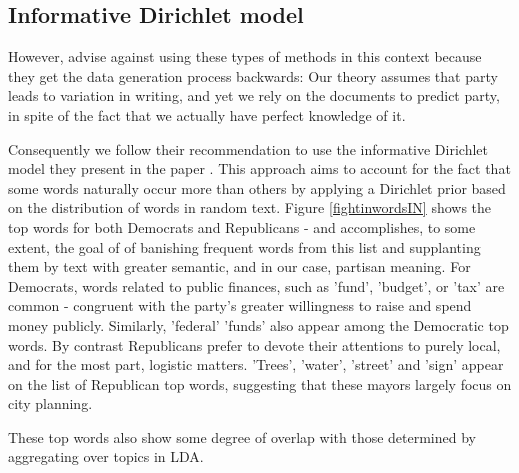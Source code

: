\documentclass[11pt]{article}
\begin{document}

\subsection{Informative Dirichlet model}
However, \cite{Monroe2008} advise against using these types of methods in this context because they get the data generation process backwards: Our theory assumes that party leads to variation in writing, and yet we rely on the documents to predict party, in spite of the fact that we actually have perfect knowledge of it.

Consequently we follow their recommendation to use the informative Dirichlet model they present in the paper \citep{Monroe2008}. This approach aims to account for the fact that some words naturally occur more than others by applying a Dirichlet prior based on the distribution of words in random text. Figure \ref{fightinwordsIN} shows the top words for both Democrats and Republicans - and accomplishes, to some extent, the goal of \citep{Monroe2008} of banishing frequent words from this list and supplanting them by text with greater semantic, and in our case, partisan meaning. For Democrats, words related to public finances, such as 'fund', 'budget', or 'tax' are common - congruent with the party's greater willingness to raise and spend money publicly. Similarly, 'federal' 'funds' also appear among the Democratic top words. By contrast Republicans prefer to devote their attentions to purely local, and for the most part, logistic matters. 'Trees', 'water', 'street' and 'sign' appear on the list of Republican top words, suggesting that these mayors largely focus on city planning.

These top words also show some degree of overlap with those determined by aggregating over topics in LDA.
\end{document}
